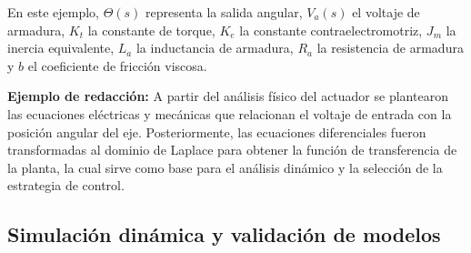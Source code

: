 \documentclass[12pt,letterpaper]{report}
\begin{document}
\begin{instrucciones}
\noindent En este ejemplo, $\Theta(s)$ representa la salida angular, $V_a(s)$ el voltaje de armadura, $K_t$ la constante de torque, $K_e$ la constante contraelectromotriz, $J_m$ la inercia equivalente, $L_a$ la inductancia de armadura, $R_a$ la resistencia de armadura y $b$ el coeficiente de fricción viscosa.

\vspace{2mm}
\noindent \textbf{Ejemplo de redacción:} A partir del análisis físico del actuador se plantearon las ecuaciones eléctricas y mecánicas que relacionan el voltaje de entrada con la posición angular del eje. Posteriormente, las ecuaciones diferenciales fueron transformadas al dominio de Laplace para obtener la función de transferencia de la planta, la cual sirve como base para el análisis dinámico y la selección de la estrategia de control.
\end{instrucciones}

\subsection{Simulación dinámica y validación de modelos}
\end{document}
